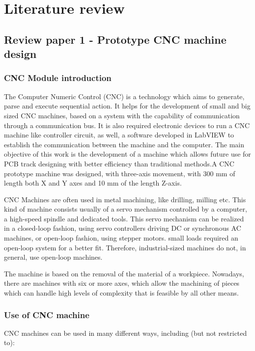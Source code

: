 \chapter{Literature review} \label{chapter2}

\section{Review paper 1 - Prototype CNC machine design}

\subsection{CNC Module introduction}
The Computer Numeric Control (CNC) is a technology which aims to generate, parse and execute sequential action. It helps for the development of small and big sized CNC machines, based on a system with the capability of communication through a communication bus. It is also required electronic devices to run a CNC machine like controller circuit, as well, a software developed in LabVIEW to establish the communication between the machine and the computer. The main objective of this work is the development of a machine which allows future use for PCB track designing with better efficiency than traditional methods.A CNC prototype machine was designed, with three-axis movement, with 300 mm of length both X and Y axes and 10 mm of the length Z-axis. \par

CNC Machines are often used in metal machining, like drilling, milling etc. This kind of machine consists usually of a servo mechanism controlled by a computer, a high-speed spindle and dedicated tools. This servo mechanism can be realized in a closed-loop fashion, using servo controllers driving DC or synchronous AC machines, or open-loop fashion, using stepper motors. small loads required an open-loop system for a better fit. Therefore, industrial-sized machines do not, in general, use open-loop machines. \par

The machine is based on the removal of the material of a workpiece. Nowadays, there are machines with six or more axes, which allow the machining of pieces which can handle high levels of complexity that is feasible by all other means.


\subsection{Use of CNC machine}
CNC machines can be used in many different ways, including (but not restricted to):

